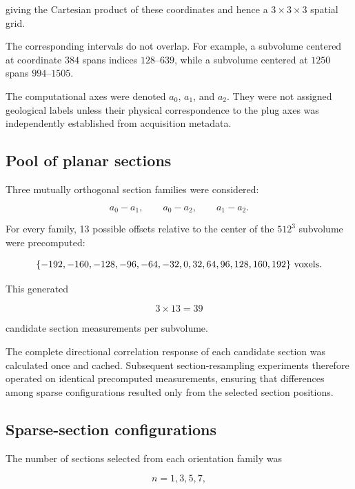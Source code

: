 \documentclass{article}
\begin{document}
giving the Cartesian product of these coordinates and hence a
$3\times3\times3$ spatial grid.

The corresponding intervals do not overlap. For example, a subvolume
centered at coordinate $384$ spans indices $128$--$639$, while a
subvolume centered at $1250$ spans $994$--$1505$.

The computational axes were denoted $a_0$, $a_1$, and $a_2$. They were
not assigned geological labels unless their physical correspondence to
the plug axes was independently established from acquisition metadata.

\subsection{Pool of planar sections}
\label{sec:SI_section_pool}

Three mutually orthogonal section families were considered:

\begin{equation}
    a_0-a_1,\qquad
    a_0-a_2,\qquad
    a_1-a_2.
\end{equation}

For every family, 13 possible offsets relative to the center of the
$512^3$ subvolume were precomputed:

\begin{equation}
\{-192,-160,-128,-96,-64,-32,0,
32,64,96,128,160,192\}
\ {\rm voxels}.
\end{equation}

This generated

\begin{equation}
    3\times13=39
\end{equation}

candidate section measurements per subvolume.

The complete directional correlation response of each candidate section
was calculated once and cached. Subsequent section-resampling
experiments therefore operated on identical precomputed measurements,
ensuring that differences among sparse configurations resulted only
from the selected section positions.

\subsection{Sparse-section configurations}
\label{sec:SI_sparse_configs}

The number of sections selected from each orientation family was

\begin{equation}
    n=1,3,5,7,
\end{equation}
\end{document}
